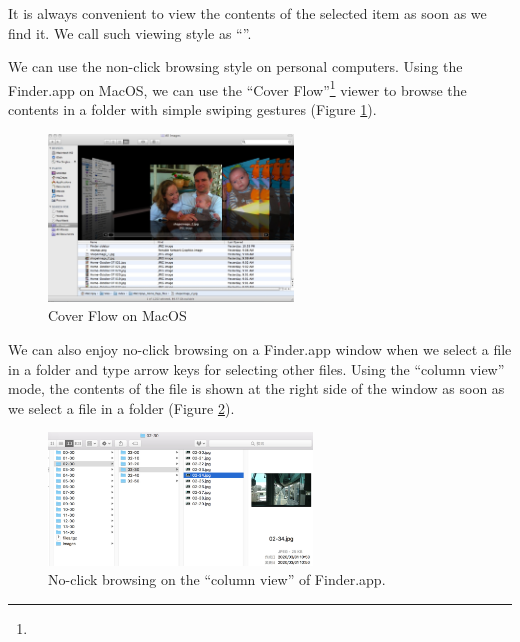 \documentclass[conference]{IEEEtran}
\begin{document}
It is always convenient to view the contents of the selected item
as soon as we find it.
We call such viewing style as ``\textbf{}''.

We can use the non-click browsing style on personal computers.
Using the Finder.app on MacOS, we can use the ``Cover Flow''\footnote{
} viewer to browse the contents in a folder
with simple swiping gestures (Figure \ref{coverflow}).

\begin{figure}[H]
\centerline{\includegraphics[width=65mm,bb=0 0 1080 740]{figures/902678c6770b5e043baa6f503375749f.jpg}}
\caption{Cover Flow on MacOS}
\label{coverflow}
\end{figure}

We can also enjoy no-click browsing on a Finder.app window
when we select a file in a folder and
type arrow keys for selecting other files.
Using the ``column view'' mode, 
the contents of the file is shown at the right side of the window
as soon as we select a file in a folder (Figure \ref{noclickfinder}).

\begin{figure}[H]
\centerline{\includegraphics[width=70mm,bb=0 0 839 423]{figures/10d7ca6c55aa93ebcdab799246e4c087.jpg}}
\caption{No-click browsing on the ``column view'' of Finder.app.}
\label{noclickfinder}
\end{figure}


\end{document}
